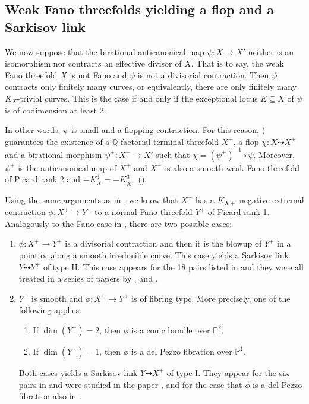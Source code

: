 \documentclass[english,11pt,reqno]{amsart}
\newcommand{\sub}{\subseteq}
\newcommand{\Pone}{\mathbb{P}^1}
\newcommand{\Ptwo}{\mathbb{P}^2}
\begin{document}
\subsection{Weak Fano threefolds yielding a flop and a Sarkisov link} \label{subsection:flop}
%
%
We now suppose that the birational anticanonical map $\psi: X\rightarrow X'$ neither is an isomorphism nor contracts an effective divisor of $X$. That is to say, the weak Fano threefold $X$ is not Fano and $\psi$ is not a divisorial contraction. 
%
%
Then $\psi$ contracts only finitely many curves, or equivalently, there are only finitely many $K_X$-trivial curves. This is the case if and only if the exceptional locus $E\sub X$ of $\psi$ is of codimension at least 2.\par 
In other words, $\psi$ is small and a flopping contraction. For this reason, \cite[Thm.\ 1.4.15]{Shafarevich_Parshin_AlgGeom_Fano_varieties}) guarantees the existence of a $\mathbb{Q}$-factorial terminal threefold $X^+$, a flop $\chi:X\dashrightarrow X^+$ and a birational morphism $\psi^+:X^+\rightarrow X'$ such that $\chi = (\psi^+)^{-1} \circ \psi$. Moreover, $\psi^+$ is the anticanonical map of $X^+$ and $X^+$ is also a smooth weak Fano threefold of Picard rank 2 and $-K_X^3=-K_{X^+}^3$ (\cite[Prop.\ 2.2]{Weak_Fano_threefolds_II-Jahnke_Peternell_Radloff}).\par
%
Using the same arguments as in , we know that $X^+$ has a $K_{X+}$-negative extremal contraction $\phi:X^+\rightarrow Y^+$ to a normal Fano threefold $Y^+$ of Picard rank 1. Analogously to the Fano case in , there are two possible cases:
%
\begin{enumerate}
\item[(1)] $\phi:X^+\rightarrow Y^+$ is a divisorial contraction and then it is the blowup of $Y^+$ in a point or along a smooth irreducible curve. This case yields a Sarkisov link $Y \dashrightarrow Y^+$ of type II. This case appears for the 18 pairs listed in  and they were all treated in a series of papers by \cite{Cutrone_Marshburn_Classification}, \cite{Arap_Cutrone_Marshburn_weak_Fano_threefolds_Existence} and \cite{Cutrone_Marshburn_Update}.
\item[(2)] $Y^+$ is smooth and $\phi:X^+\rightarrow Y^+$ is of fibring type. More precisely, one of the following applies:
\begin{enumerate}
\item If $\dim(Y^+)=2$, then $\phi$ is a conic bundle over $\Ptwo$.
\item If $\dim(Y^+)=1$, then $\phi$ is a del Pezzo fibration over $\Pone$.
\end{enumerate}
Both cases yields a Sarkisov link $Y\dashrightarrow X^+$ of type I. They appear for the six pairs in  and were studied in the paper \cite{Weak_Fano_threefolds_II-Jahnke_Peternell_Radloff}, and for the case that $\phi$ is a del Pezzo fibration also in \cite{Takeuchi-Weak_Fano_threefolds_del_Pezzo_fibration}.
\end{enumerate}
\end{document}
